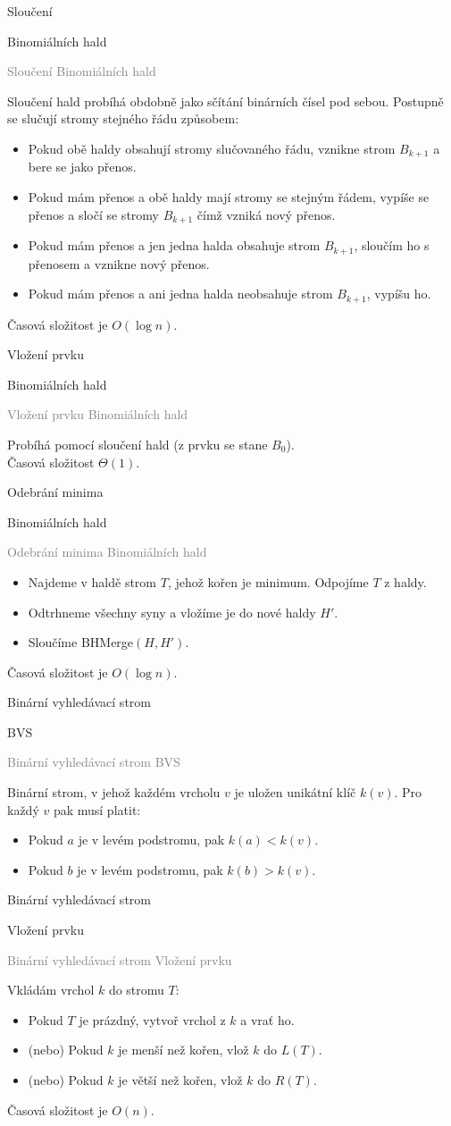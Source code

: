 \documentclass[20pt]{extarticle}
\newcommand{\card}[3][]{
	\vspace*{\fill}

	\newpage
	\topskip0pt
	\vspace*{\fill}
		\Large #2

		\vspace{1cm}
		\normalsize #1
	\vspace*{\fill}
	\newpage

	\small \textcolor{gray}{#2 #1}
	\topskip0pt
	\vspace*{\fill}

	\normalsize
	#3
	\vspace*{\fill}
}
\begin{document}
\begin{center}
\card[Binomiálních hald]{Sloučení}{
  \footnotesize
	Sloučení hald probíhá obdobně jako sčítání binárních čísel pod sebou.
	Postupně se slučují stromy stejného řádu způsobem:
	\begin{itemize}
		\item Pokud obě haldy obsahují stromy slučovaného řádu, vznikne strom $B_{k+1}$
		a bere se jako přenos.
		\item Pokud mám přenos a obě haldy mají stromy se stejným řádem, vypíše se
		přenos a sločí se stromy $B_{k+1}$ čímž vzniká nový přenos.
		\item Pokud mám přenos a jen jedna halda obsahuje strom $B_{k+1}$, sloučím
		ho s přenosem a vznikne nový přenos.
		\item Pokud mám přenos a ani jedna halda neobsahuje strom $B_{k+1}$, vypíšu ho.
	\end{itemize}
	Časová složitost je $O(\log n)$.
	\normalsize
}

\card[Binomiálních hald]{Vložení prvku}{
	Probíhá pomocí sloučení hald (z prvku se stane $B_0$).\\
	Časová složitost $\Theta(1)$.
}

\card[Binomiálních hald]{Odebrání minima}{
	\small
	\begin{itemize}
		\item Najdeme v haldě strom $T$, jehož kořen je minimum. Odpojíme $T$ z haldy.
		\item Odtrhneme všechny syny a vložíme je do nové haldy $H'$.
		\item Sloučíme BHMerge$(H, H')$.
	\end{itemize}
	Časová složitost je $O(\log n)$.
	\normalsize
}

\card[BVS]{Binární vyhledávací strom}{
	Binární strom, v jehož každém vrcholu $v$ je uložen unikátní klíč $k(v)$.
	Pro každý $v$ pak musí platit:
	\begin{itemize}
		\item Pokud $a$ je v levém podstromu, pak $k(a) < k(v)$.
		\item Pokud $b$ je v levém podstromu, pak $k(b) > k(v)$.
	\end{itemize}
}

\card[Vložení prvku]{Binární vyhledávací strom}{
	\small
	Vkládám vrchol $k$ do stromu $T$:
	\begin{itemize}
		\item Pokud $T$ je prázdný, vytvoř vrchol z $k$ a vrať ho.
		\item (nebo) Pokud $k$ je menší než kořen, vlož $k$ do $L(T)$.
		\item (nebo) Pokud $k$ je větší než kořen, vlož $k$ do $R(T)$.
	\end{itemize}
	Časová složitost je $O(n)$.
}


\end{center}
\end{document}
